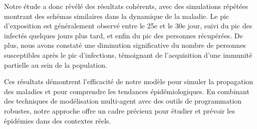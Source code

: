 \documentclass[french]{article}
\begin{document}
Notre étude a donc révélé des résultats cohérents, avec des simulations répétées montrant des schémas similaires dans la dynamique de la maladie. Le pic d'exposition est généralement observé entre le 25e et le 30e jour, suivi du pic des infectés quelques jours plus tard, et enfin du pic des personnes récupérées. De plus, nous avons constaté une diminution significative du nombre de personnes susceptibles après le pic d'infections, témoignant de l'acquisition d'une immunité partielle au sein de la population.

Ces résultats démontrent l'efficacité de notre modèle pour simuler la propagation des maladies et pour comprendre les tendances épidémiologiques. En combinant des techniques de modélisation multi-agent avec des outils de programmation robustes, notre approche offre un cadre précieux pour étudier et prévoir les épidémies dans des contextes réels.
\end{document}

